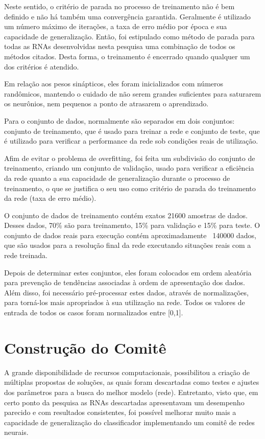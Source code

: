Neste sentido, o critério de parada no processo de treinamento não é bem definido e não há também uma convergência garantida. Geralmente é utilizado um número máximo de iterações, a taxa de erro médio por época e sua capacidade de generalização. Então, foi estipulado como método de parada para todas as RNAs desenvolvidas nesta pesquisa uma combinação de todos os métodos citados. Desta forma, o treinamento é encerrado quando qualquer um dos critérios é atendido.

Em relação aos pesos sinápticos, eles foram inicializados com números randômicos, mantendo o cuidado de não serem grandes suficientes para saturarem os neurônios, nem pequenos a ponto de atrasarem o aprendizado.

Para o conjunto de dados, normalmente são separados em dois conjuntos: conjunto de treinamento, que é usado para treinar a rede e conjunto de teste, que é utilizado para verificar a performance da rede sob condições reais de utilização. 

Afim de evitar o problema de overfitting, foi feita um subdivisão do conjunto de treinamento, criando um conjunto de validação, usado para verificar a eficiência da rede quanto a sua capacidade de generalização durante o processo de treinamento, o que se justifica o seu uso como critério de parada do treinamento da rede (taxa de erro médio).

O conjunto de dados de treinamento contém exatos 21600 amostras de dados. Desses dados, 70\% são para treinamento, 15\% para validação e 15\% para teste. O conjunto de dados reais para execução contém aproximadamente ~140000 dados, que são usados para a resolução final da rede executando situações reais com a rede treinada.

Depois de determinar estes conjuntos, eles foram colocados em ordem aleatória para prevenção de tendências associadas à ordem de apresentação dos dados. Além disso, foi necessário pré-processar estes dados, através de normalizações, para torná-los mais apropriados à sua utilização na rede. Todos os valores de entrada de todos os casos foram normalizados entre [0,1].

\section{Construção do Comitê}

A grande disponibilidade de recursos computacionais, possibilitou a criação de múltiplas propostas de soluções, as quais foram descartadas como testes e ajustes dos parâmetros para a busca do melhor modelo (rede). Entretanto, visto que, em certo ponto da pesquisa as RNAs descartadas apresentavam um desempenho parecido e com resultados consistentes, foi possível melhorar muito mais a capacidade de generalização do classificador implementando um comitê de redes neurais.

